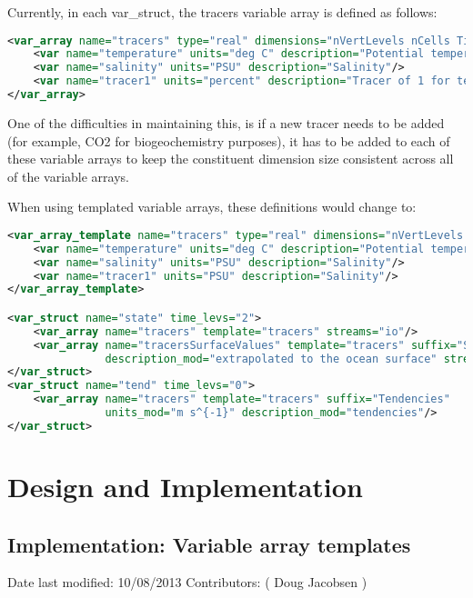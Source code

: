 \documentclass[11pt]{report}
\begin{document}
Currently, in each var\_struct, the tracers variable array is defined as follows:

{\scriptsize
\begin{lstlisting}[language=XML]
<var_array name="tracers" type="real" dimensions="nVertLevels nCells Time">
	<var name="temperature" units="deg C" description="Potential temperature"/>
	<var name="salinity" units="PSU" description="Salinity"/>
	<var name="tracer1" units="percent" description="Tracer of 1 for testing"/>
</var_array>
\end{lstlisting}
}

One of the difficulties in maintaining this, is if a new tracer needs to be
added (for example, CO2 for biogeochemistry purposes), it has to be added to
each of these variable arrays to keep the constituent dimension size consistent
across all of the variable arrays.

When using templated variable arrays, these definitions would change to:

{\scriptsize
\begin{lstlisting}[language=XML]
<var_array_template name="tracers" type="real" dimensions="nVertLevels nCells Time">
	<var name="temperature" units="deg C" description="Potential temperature"/>
	<var name="salinity" units="PSU" description="Salinity"/>
	<var name="tracer1" units="PSU" description="Salinity"/>
</var_array_template>

<var_struct name="state" time_levs="2">
	<var_array name="tracers" template="tracers" streams="io"/>
	<var_array name="tracersSurfaceValues" template="tracers" suffix="SurfaceValues"
			   description_mod="extrapolated to the ocean surface" streams="o"/>
</var_struct>
<var_struct name="tend" time_levs="0">
	<var_array name="tracers" template="tracers" suffix="Tendencies"
			   units_mod="m s^{-1}" description_mod="tendencies"/>
</var_struct>
\end{lstlisting}
}

\chapter{Design and Implementation}

\section{Implementation: Variable array templates}
Date last modified: 10/08/2013
Contributors: ( Doug Jacobsen ) \\
\end{document}
